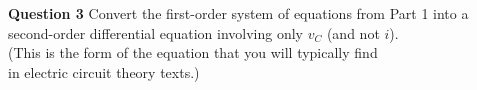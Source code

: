 \documentclass[preview]{standalone}
\begin{document}
\begin{center}
\raggedright
                    \textbf{Question 3}
                    Convert the first-order system of equations from Part 1 into a \\
                    second-order differential equation involving only \( v_C \) (and not \( i \)). \\
                    (This is the form of the equation that you will typically find \\
                    in electric circuit theory texts.)
\end{center}
\end{document}
